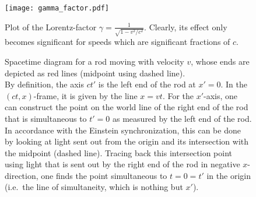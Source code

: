 \begin{figure}
	\centering
	
	\texttt{[image: gamma\_factor.pdf]}
	
	\caption[Plot of the Lorentz-factor]{Plot of the Lorentz-factor $\gamma = \frac{1}{\sqrt{1 - v^2 / c^2}}$.	Clearly, its effect only becomes significant for speeds which are significant fractions of $c$.}
	\label{fig:gamma_factor}
\end{figure}



\begin{figure}
	\centering



		\caption[Spacetime diagram for a moving rod]{Spacetime diagram for a rod moving with velocity $v$, whose ends are depicted as red lines (midpoint using dashed line).\\
		By definition, the axis $ct'$ is the left end of the rod at $x' = 0$. In the $(ct, x)$-frame, it is given by the line $x = vt$. For the $x'$-axis, one can construct the point on the world line of the right end of the rod that is simultaneous to $t' = 0$ as measured by the left end of the rod. In accordance with the Einstein synchronization, this can be done by looking at light sent out from the origin and its intersection with the midpoint (dashed line). Tracing back this intersection point using light that is sent out by the right end of the rod in negative $x$-direction, one finds the point simultaneous to $t = 0 = t'$ in the origin (i.e.~the line of simultaneity, which is nothing but $x'$).}
		\label{fig:moving_rod_diagram}
\end{figure}





